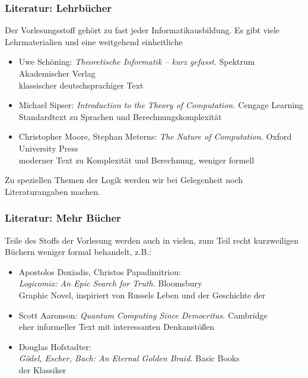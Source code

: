 \documentclass[aspectratio=1610,onlymath]{beamer}
\begin{document}

\begin{frame}\frametitle{Literatur: Lehrbücher}

Der Vorlesungsstoff gehört zu fast jeder Informatikausbildung. Es gibt viele
Lehrmaterialien und eine weitgehend einheitliche 
\bigskip

\begin{itemize}
\item Uwe Schöning: \emph{Theoretische Informatik -- kurz gefasst.} Spektrum Akademischer Verlag\\
{\footnotesize\textcolor{devilscss}{klassischer deutschsprachiger Text}}
%
\item Michael Sipser: \emph{Introduction to the Theory of Computation.}  Cengage Learning\\
{\footnotesize\textcolor{devilscss}{Standardtext zu Sprachen und Berechnungskomplexität}}
%
\item Christopher Moore, Stephan Meterns: \emph{The Nature of Computation.} Oxford University Press\\
{\footnotesize\textcolor{devilscss}{moderner Text zu Komplexität und Berechnung, weniger formell}}
\end{itemize}

Zu speziellen Themen der Logik werden wir bei Gelegenheit noch Literaturangaben machen.

\end{frame}

\begin{frame}\frametitle{Literatur: Mehr Bücher}

Teile des Stoffs der Vorlesung werden auch in vielen, zum Teil recht kurzweiligen
Büchern weniger formal behandelt, z.B.:
\bigskip

\begin{itemize}
\item Apostolos Doxiadis, Christos Papadimitriou:\\ \emph{Logicomix: An Epic Search for Truth.} Bloomsbury\\
{\footnotesize\textcolor{devilscss}{Graphic Novel, inspiriert von Russels Leben und der Geschichte der }}
%
\item Scott Aaronson: \emph{Quantum Computing Since Democritus.} Cambridge\\
{\footnotesize\textcolor{devilscss}{eher informeller Text mit interessanten Denkanstößen}}
%
\item Douglas Hofstadter:\\ \emph{Gödel, Escher, Bach: An Eternal Golden Braid.} Basic Books\\
{\footnotesize\textcolor{devilscss}{der Klassiker}}
\end{itemize}

\end{frame}
\end{document}
